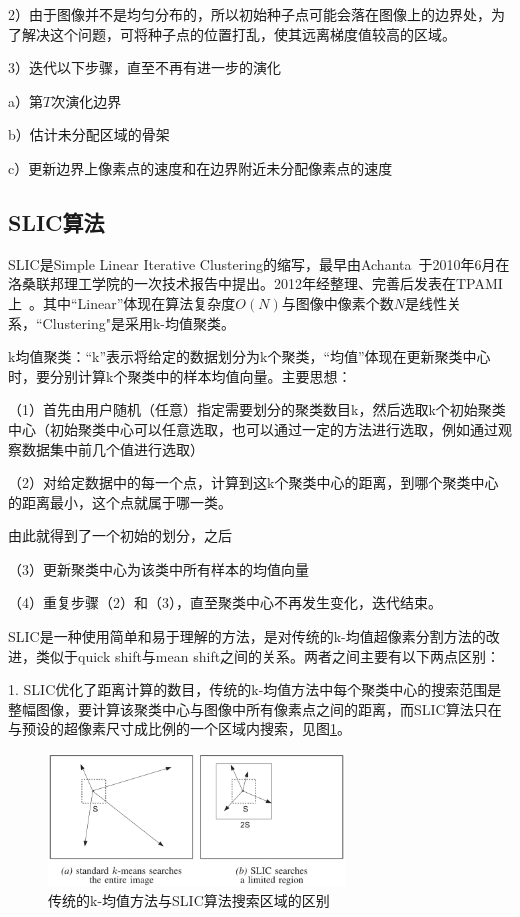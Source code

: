 \documentclass[12pt]{article}
\begin{document}
2）由于图像并不是均匀分布的，所以初始种子点可能会落在图像上的边界处，为了解决这个问题，可将种子点的位置打乱，使其远离梯度值较高的区域。

3）迭代以下步骤，直至不再有进一步的演化
 
a）第$T$次演化边界

b）估计未分配区域的骨架

c）更新边界上像素点的速度和在边界附近未分配像素点的速度

\subsection{SLIC算法}

SLIC是Simple Linear Iterative Clustering的缩写，最早由Achanta~\cite{achanta2010slic}于2010年6月在洛桑联邦理工学院的一次技术报告中提出。2012年经整理、完善后发表在TPAMI上~\cite{achanta2012slic}。其中“Linear”体现在算法复杂度$O(N)$与图像中像素个数$N$是线性关系，“Clustering"是采用k-均值聚类。

k均值聚类：“k”表示将给定的数据划分为k个聚类，“均值”体现在更新聚类中心时，要分别计算k个聚类中的样本均值向量。主要思想：

（1）首先由用户随机（任意）指定需要划分的聚类数目k，然后选取k个初始聚类中心（初始聚类中心可以任意选取，也可以通过一定的方法进行选取，例如通过观察数据集中前几个值进行选取）

（2）对给定数据中的每一个点，计算到这k个聚类中心的距离，到哪个聚类中心的距离最小，这个点就属于哪一类。

由此就得到了一个初始的划分，之后

（3）更新聚类中心为该类中所有样本的均值向量

（4）重复步骤（2）和（3），直至聚类中心不再发生变化，迭代结束。

SLIC是一种使用简单和易于理解的方法，是对传统的k-均值超像素分割方法的改进，类似于quick shift与mean shift之间的关系。两者之间主要有以下两点区别：

1. SLIC优化了距离计算的数目，传统的k-均值方法中每个聚类中心的搜索范围是整幅图像，要计算该聚类中心与图像中所有像素点之间的距离，而SLIC算法只在与预设的超像素尺寸成比例的一个区域内搜索，见图\ref{fig: searchregion}。

\begin{figure}[!ht]
\centering
\includegraphics[width=0.7\textwidth]{searchregion.png}
\caption{传统的k-均值方法与SLIC算法搜索区域的区别}
\label{fig: searchregion}
\end{figure} 
\end{document}
